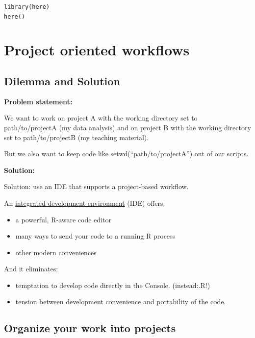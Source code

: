 \documentclass[
  letterpaper,
  DIV=11,
  numbers=noendperiod]{scrreprt}
\providecommand{\tightlist}{%
  \setlength{\itemsep}{0pt}\setlength{\parskip}{0pt}}
\begin{document}
\begin{verbatim}
library(here)
here()
\end{verbatim}

\hypertarget{project-oriented-workflows}{%
\section{Project oriented workflows}\label{project-oriented-workflows}}

\hypertarget{dilemma-and-solution}{%
\subsection{Dilemma and Solution}\label{dilemma-and-solution}}

\textbf{Problem statement:}

We want to work on project A with the working directory set to
path/to/projectA (my data analysis) and on project B with the working
directory set to path/to/projectB (my teaching material).

But we also want to keep code like setwd(``path/to/projectA'') out of
our scripts.

\textbf{Solution:}

Solution: use an IDE that supports a project-based workflow.

An
\href{https://en.wikipedia.org/wiki/Integrated_development_environment}{integrated
development environment} (IDE) offers:

\begin{itemize}
\tightlist
\item
  a powerful, R-aware code editor
\item
  many ways to send your code to a running R process
\item
  other modern conveniences
\end{itemize}

And it eliminates:

\begin{itemize}
\tightlist
\item
  temptation to develop code directly in the Console. (instead:.R!)
\item
  tension between development convenience and portability of the code.
\end{itemize}

\hypertarget{organize-your-work-into-projects}{%
\subsection{Organize your work into
projects}\label{organize-your-work-into-projects}}
\end{document}
